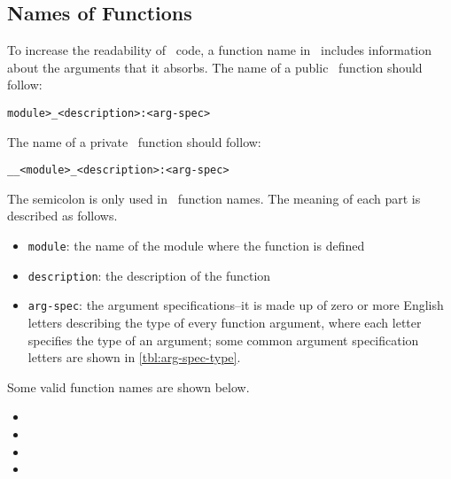 \documentclass{ltugboat}
\begin{document}
\subsection{Names of Functions}
To increase the readability of \liii\ code, a function name in \liii\ includes information about the arguments that it absorbs. The name of a public \liii\ function should follow:
\begin{center}
\texttt{\string\<module>\_<description>:<arg-spec>}
\end{center}
The name of a private \liii\ function should follow:
\begin{center}
\texttt{\string\_\_<module>\_<description>:<arg-spec>}
\end{center}
The semicolon is only used in \liii\ function names.
The meaning of each part is described as follows.
\begin{itemize}
\item \texttt{module}: the name of the module where the function is defined
\item \texttt{description}: the description of the function
\item \texttt{arg-spec}: the argument specifications--it is made up of zero or more English letters describing the type of every function argument, where each letter specifies the type of an argument; some common argument specification letters are shown in \cref{tbl:arg-spec-type}.
\end{itemize}
Some valid function names are shown below.
\begin{itemize}
\item {}
\item {}
\item {}
\item {}
\end{itemize}
\end{document}

